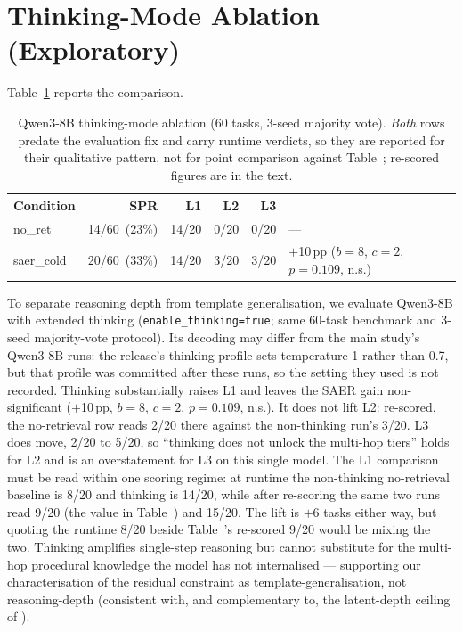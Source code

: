 \documentclass[letterpaper]{article} %
\newcommand{\bodyref}[1]{\getrefnumber{#1}}
\begin{document}
\section{Thinking-Mode Ablation (Exploratory)}
\label{app:thinking}

Table~\ref{tab:thinking} reports the comparison.

\begin{table}[tbp]
\centering
\caption{Qwen3-8B thinking-mode ablation (60 tasks, 3-seed majority vote).
\emph{Both} rows predate the evaluation fix and carry runtime verdicts, so
they are reported for their qualitative pattern, not for point comparison
against Table~\bodyref{tab:main}; re-scored figures are in the text.}
\label{tab:thinking}
\small
\begin{tabular}{lrrrrl}
\toprule
Condition & SPR & L1 & L2 & L3 & \\
\midrule
no\_ret    & 14/60~(23\%) & 14/20 & 0/20 & 0/20 & --- \\
saer\_cold & 20/60~(33\%) & 14/20 & 3/20 & 3/20 & $+$10\,pp ($b{=}8$, $c{=}2$, $p{=}0.109$, n.s.) \\
\bottomrule
\end{tabular}
\end{table}

To separate reasoning depth from template generalisation, we evaluate
Qwen3-8B with extended thinking (\texttt{enable\_thinking=true};
same 60-task benchmark and 3-seed majority-vote protocol).  Its decoding may differ
from the main study's Qwen3-8B runs: the release's thinking profile sets
temperature 1 rather than 0.7, but that profile was committed after these runs,
so the setting they used is not recorded.
Thinking substantially raises L1 and leaves the SAER gain non-significant
($+$10\,pp, $b{=}8$, $c{=}2$, $p{=}0.109$, n.s.).  It does not lift L2: re-scored, the
no-retrieval row reads 2/20 there against the non-thinking run's 3/20.  L3
does move, 2/20 to 5/20, so ``thinking does not unlock the multi-hop tiers''
holds for L2 and is an overstatement for L3 on this single model.  The L1
comparison must be read within one scoring regime: at runtime the
non-thinking no-retrieval baseline is 8/20 and thinking is 14/20, while after
re-scoring the same two runs read 9/20 (the value in
Table~\bodyref{tab:main}) and 15/20.  The lift is $+$6 tasks either way, but
quoting the runtime 8/20 beside Table~\bodyref{tab:main}'s re-scored 9/20 would
be mixing the two.
Thinking amplifies single-step reasoning but cannot substitute for the
multi-hop procedural knowledge the model has not internalised --- supporting
our characterisation of the residual constraint as template-generalisation,
not reasoning-depth (consistent with, and complementary to, the
latent-depth ceiling of \citet{xu2026depthceiling}).
\end{document}
